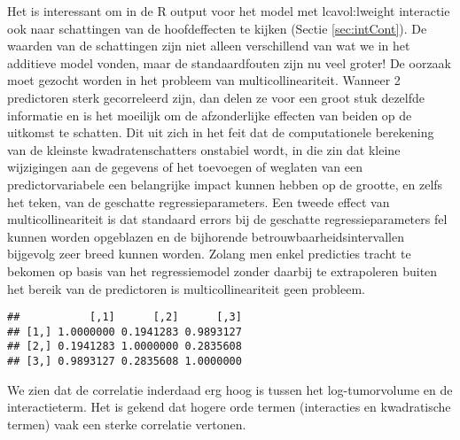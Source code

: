 \documentclass[
  12pt,dutch,coursenotes]{book}
\newenvironment{Shaded}{\begin{snugshade}}{\end{snugshade}}
\newcommand{\KeywordTok}[1]{\textcolor[rgb]{0.13,0.29,0.53}{\textbf{#1}}}
\newcommand{\NormalTok}[1]{#1}
\newcommand{\OperatorTok}[1]{\textcolor[rgb]{0.81,0.36,0.00}{\textbf{#1}}}
\newcommand{\StringTok}[1]{\textcolor[rgb]{0.31,0.60,0.02}{#1}}
\theoremstyle{definition}
\theoremstyle{definition}
\theoremstyle{definition}
\theoremstyle{remark}
\begin{document}
Het is interessant om in de R output voor het model met lcavol:lweight interactie ook naar schattingen van de hoofdeffecten te kijken (Sectie \ref{sec:intCont}).
De waarden van de schattingen zijn niet alleen verschillend van wat we in het additieve model vonden, maar de standaardfouten zijn nu veel groter!
De oorzaak moet gezocht worden in het probleem van multicollineariteit.
Wanneer 2 predictoren sterk gecorreleerd zijn, dan delen ze voor een groot stuk dezelfde informatie en is het moeilijk om de afzonderlijke effecten van beiden op de uitkomst te schatten. Dit uit zich in het feit dat de computationele berekening van de kleinste kwadratenschatters onstabiel wordt, in die zin dat kleine wijzigingen aan de gegevens of het toevoegen of weglaten van een predictorvariabele een belangrijke impact kunnen hebben op de grootte, en zelfs het teken, van de geschatte regressieparameters.
Een tweede effect van multicollineariteit is dat standaard errors bij de geschatte regressieparameters fel kunnen worden opgeblazen en de bijhorende betrouwbaarheidsintervallen bijgevolg zeer breed kunnen worden. Zolang men enkel predicties tracht te bekomen op basis van het regressiemodel zonder daarbij te extrapoleren buiten het bereik van de predictoren is multicollineariteit geen probleem.

\begin{Shaded}
\end{Shaded}

\begin{verbatim}
##           [,1]      [,2]      [,3]
## [1,] 1.0000000 0.1941283 0.9893127
## [2,] 0.1941283 1.0000000 0.2835608
## [3,] 0.9893127 0.2835608 1.0000000
\end{verbatim}

We zien dat de correlatie inderdaad erg hoog is tussen het log-tumorvolume en de interactieterm.
Het is gekend dat hogere orde termen (interacties en kwadratische termen) vaak een sterke correlatie vertonen.
\end{document}
